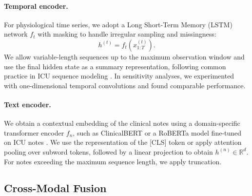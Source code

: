 \documentclass{article}
\begin{document}
\paragraph{Temporal encoder.}
For physiological time series, we adopt a Long Short-Term Memory (LSTM) network $f_t$ with masking to handle irregular sampling and missingness: 
 \begin{equation} 
   h^{(t)} = f_t(x^{(t)}_{1:T}). 
 \end{equation} 
 We allow variable-length sequences up to the maximum observation window and use the final hidden state as a summary representation, following common practice in ICU sequence modeling \cite{Khadanga2019ICUNotes,Shukla2020IntegratingTSNotes}. 
 In sensitivity analyses, we experimented with one-dimensional temporal convolutions and found comparable performance.

\paragraph{Text encoder.}
We obtain a contextual embedding of the clinical notes using a domain-specific transformer encoder $f_n$, such as ClinicalBERT or a RoBERTa model fine-tuned on ICU notes \cite{Deznabi2021MortalityNotes,Lyu2023MultimodalTransformer,King2023MultimodalPretrain}. 
 We use the representation of the [CLS] token or apply attention pooling over subword tokens, followed by a linear projection to obtain $h^{(n)} \in \mathbb{R}^{d}$. 
 For notes exceeding the maximum sequence length, we apply truncation.

\subsection{Cross-Modal Fusion}
\end{document}
